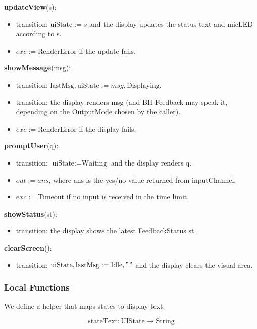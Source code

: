 \documentclass[12pt, titlepage]{article}
\begin{document}
\noindent
\textbf{updateView}(s):
\begin{itemize}
  \item transition: $\text{uiState} := s$ and the display updates the status text
  and micLED according to s.
  \item $exc := \text{RenderError}$ if the update fails.
\end{itemize}

\noindent
\textbf{showMessage}(msg):
\begin{itemize}
  \item transition: $\text{lastMsg}, \text{uiState} := msg, \text{Displaying}$.
  \item transition: the display renders msg (and BH-Feedback may speak it,
  depending on the OutputMode chosen by the caller).
  \item $exc := \text{RenderError}$ if the display fails.
\end{itemize}

\noindent
\textbf{promptUser}(q):
\begin{itemize}
  \item transition: $\text{uiState} := \text{Waiting}$ and the display renders q.
  \item $out := ans$, where ans is the yes/no value returned from inputChannel.
  \item $exc := \text{Timeout}$ if no input is received in the time limit.
\end{itemize}

\noindent
\textbf{showStatus}(st):
\begin{itemize}
  \item transition: the display shows the latest FeedbackStatus st.
\end{itemize}

\noindent
\textbf{clearScreen}():
\begin{itemize}
  \item transition: $\text{uiState}, \text{lastMsg} := \text{Idle}, ""$ and the
  display clears the visual area.
\end{itemize}

\subsubsection{Local Functions}

\noindent
We define a helper that maps states to display text:

\[
  \text{stateText} : \text{UIState} \rightarrow \text{String}
\]
\end{document}
